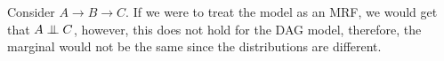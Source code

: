 \tffalse 

Consider $A \rightarrow B \rightarrow C$. If we were to treat the model as an MRF, we would get that $A \mathrel{\perp\mkern-10mu\perp} C$, however, this does not hold for the DAG model, therefore, the marginal would not be the same since the distributions are different.